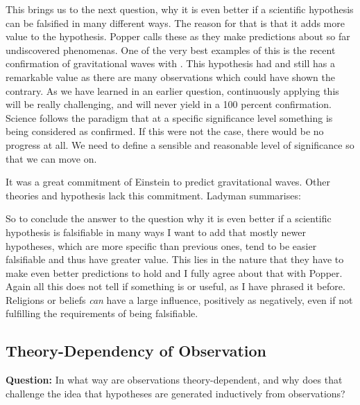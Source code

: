 \documentclass[11pt]{scrartcl}
\begin{document}
This brings us to the next question, why it is even better if a scientific hypothesis can be falsified in many different ways. The reason for that is that it adds more value to the hypothesis. Popper calls these  \cite[p. 68]{ladyman} as they make predictions about so far undiscovered phenomenas. One of the very best examples of this is the recent confirmation of gravitational waves with  \cite{ligo}. This hypothesis had and still has a remarkable value as there are many observations which could have shown the contrary. As we have learned in an earlier question, continuously applying this will be really challenging, and will never yield in a 100 percent confirmation. Science follows the paradigm that at a specific significance level something is being considered as confirmed. If this were not the case, there would be no progress at all. We need to define a sensible and reasonable level of significance so that we can move on.

It was a great commitment of Einstein to predict gravitational waves. Other theories and hypothesis lack this commitment. Ladyman summarises:  \cite[p. 71]{ladyman}

So to conclude the answer to the question why it is even better if a scientific hypothesis is falsifiable in many ways I want to add that mostly newer hypotheses, which are more specific than previous ones, tend to be easier falsifiable and thus have greater value. This lies in the nature that they have to make even better predictions to hold \cite[p. 73]{ladyman} and I fully agree about that with Popper. Again all this does not tell if something is  \cite[p. 72]{ladyman} or useful, as I have phrased it before. Religions or beliefs \textit{can} have a large influence, positively as negatively, even if not fulfilling the requirements of being falsifiable.

\subsection{Theory-Dependency of Observation}

\textbf{Question:} In what way are observations theory-dependent, and why does that challenge the idea that hypotheses are generated inductively from observations?
\end{document}
